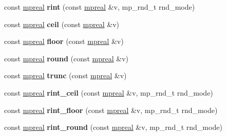 \begin{DoxyCompactItemize}
\item 
\mbox{\label{classmpfr_1_1mpreal_abe1241c4f9f70875e9782d024cd15885}} 
const \hyperlink{classmpfr_1_1mpreal}{mpreal} {\bfseries rint} (const \hyperlink{classmpfr_1_1mpreal}{mpreal} \&v, mp\+\_\+rnd\+\_\+t rnd\+\_\+mode)
\item 
\mbox{\label{classmpfr_1_1mpreal_a721c4bb16283155598236a07fb141039}} 
const \hyperlink{classmpfr_1_1mpreal}{mpreal} {\bfseries ceil} (const \hyperlink{classmpfr_1_1mpreal}{mpreal} \&v)
\item 
\mbox{\label{classmpfr_1_1mpreal_a648150f2fbbf6d7041e9c4b8d46a4325}} 
const \hyperlink{classmpfr_1_1mpreal}{mpreal} {\bfseries floor} (const \hyperlink{classmpfr_1_1mpreal}{mpreal} \&v)
\item 
\mbox{\label{classmpfr_1_1mpreal_a3a27e2ba06c4c9053627076397213c81}} 
const \hyperlink{classmpfr_1_1mpreal}{mpreal} {\bfseries round} (const \hyperlink{classmpfr_1_1mpreal}{mpreal} \&v)
\item 
\mbox{\label{classmpfr_1_1mpreal_ab572abbb811928c695eadcd587fa2e43}} 
const \hyperlink{classmpfr_1_1mpreal}{mpreal} {\bfseries trunc} (const \hyperlink{classmpfr_1_1mpreal}{mpreal} \&v)
\item 
\mbox{\label{classmpfr_1_1mpreal_aa44ebf279be721c35d7231d6d0e0f1f6}} 
const \hyperlink{classmpfr_1_1mpreal}{mpreal} {\bfseries rint\+\_\+ceil} (const \hyperlink{classmpfr_1_1mpreal}{mpreal} \&v, mp\+\_\+rnd\+\_\+t rnd\+\_\+mode)
\item 
\mbox{\label{classmpfr_1_1mpreal_a7d761a988ccde66b0680ea36579731b2}} 
const \hyperlink{classmpfr_1_1mpreal}{mpreal} {\bfseries rint\+\_\+floor} (const \hyperlink{classmpfr_1_1mpreal}{mpreal} \&v, mp\+\_\+rnd\+\_\+t rnd\+\_\+mode)
\item 
\mbox{\label{classmpfr_1_1mpreal_ac96e8d5959c0bb72e2df4ac8fd08854f}} 
const \hyperlink{classmpfr_1_1mpreal}{mpreal} {\bfseries rint\+\_\+round} (const \hyperlink{classmpfr_1_1mpreal}{mpreal} \&v, mp\+\_\+rnd\+\_\+t rnd\+\_\+mode)
\item 

\end{DoxyCompactItemize}
